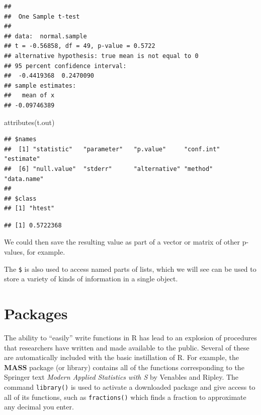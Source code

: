 \documentclass[
]{book}
\newenvironment{Shaded}{\begin{snugshade}}{\end{snugshade}}
\newcommand{\FunctionTok}[1]{\textcolor[rgb]{0.00,0.00,0.00}{#1}}
\newcommand{\NormalTok}[1]{#1}
\newcommand{\SpecialCharTok}[1]{\textcolor[rgb]{0.00,0.00,0.00}{#1}}
\begin{document}
\begin{verbatim}
## 
##  One Sample t-test
## 
## data:  normal.sample
## t = -0.56858, df = 49, p-value = 0.5722
## alternative hypothesis: true mean is not equal to 0
## 95 percent confidence interval:
##  -0.4419368  0.2470090
## sample estimates:
##   mean of x 
## -0.09746389
\end{verbatim}

\begin{Shaded}
\begin{Highlighting}[]
\FunctionTok{attributes}\NormalTok{(t.out)}
\end{Highlighting}
\end{Shaded}

\begin{verbatim}
## $names
##  [1] "statistic"   "parameter"   "p.value"     "conf.int"    "estimate"   
##  [6] "null.value"  "stderr"      "alternative" "method"      "data.name"  
## 
## $class
## [1] "htest"
\end{verbatim}

\begin{Shaded}
\end{Shaded}

\begin{verbatim}
## [1] 0.5722368
\end{verbatim}

We could then save the resulting value as part of a vector or matrix of other p-values, for example.

The \texttt{\$} is also used to access named parts of lists, which we will see can be used to store a variety of kinds of information in a single object.

\hypertarget{packages}{%
\section{Packages}\label{packages}}

The ability to ``easily'' write functions in R has lead to an explosion of procedures that researchers have written and made available to the public. Several of these are automatically included with the basic instillation of R. For example, the \textbf{MASS} package (or library) contains all of the functions corresponding to the Springer text \emph{Modern Applied Statistics with S} by Venables and Ripley. The command \texttt{library()} is used to activate a downloaded package and give access to all of its functions, such as \texttt{fractions()} which finds a fraction to approximate any decimal you enter.
\end{document}
